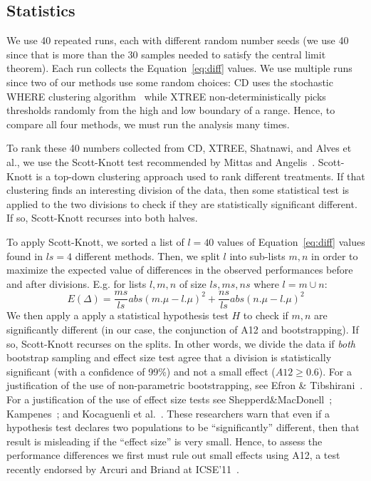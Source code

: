 \documentclass[twocolumn,5p]{elsarticle}
\newcommand{\eq}[1]{Equation~\ref{eq:#1}}
\theoremstyle{break}
\begin{document}
\begin{itemize}
		\subsection{Statistics}
		
		
		We use 40 repeated runs, each with different random number seeds (we use 40 since that is  more than the 30 samples  needed to satisfy the central limit theorem). Each run collects the \eq{diff} values.
		We use multiple runs since two of our methods use some random choices: CD uses the  stochastic WHERE clustering algorithm~\cite{localvsglobal}
		while XTREE non-deterministically picks thresholds randomly from
		the high and low boundary of a range. 
		Hence, to compare all
		four methods, we must run the analysis many times. 
		
		
		
		
		
		To rank these 40 numbers collected from CD, XTREE, Shatnawi, and Alves et al., we use the Scott-Knott test recommended by Mittas and Angelis~\cite{mittas13}. 
		Scott-Knott is a top-down clustering approach used to rank different
		treatments. If that clustering finds an interesting division of the data, then
		some statistical test is applied to the two divisions to check if they
		are statistically significant different. If so, Scott-Knott recurses
		into both halves.
		
		To  apply Scott-Knott,
		we
		sorted a list of  $l=40$ values of \eq{diff} values found in  $ls=4$ different methods. 
		Then, we split $l$ into sub-lists $m,n$ in order to maximize the expected value of differences in the observed performances before and after divisions. E.g. for lists $l,m,n$ of size $ls,ms,ns$ where $l=m\cup n$: \[E(\Delta)=\frac{ms}{ls}abs(m.\mu - l.\mu)^2 + \frac{ns}{ls}abs(n.\mu - l.\mu)^2\]
		We then apply a apply a statistical hypothesis test $H$ to check
		if $m,n$ are significantly different  (in our case, the conjunction of A12 and bootstrapping). If so, Scott-Knott recurses on the splits. In other words, we divide the data if \textit{both} bootstrap sampling and effect size test agree that a division is statistically significant (with a confidence of 99\%) and not a small effect ($A12 \ge 0.6$).
		For a justification of the use of non-parametric bootstrapping, see Efron \& Tibshirani~\cite[p220-223]{efron93}. For a justification of the use of effect size tests see Shepperd\&MacDonell~\cite{shepperd12a}; Kampenes~\cite{kampenes07}; and Kocaguenli et al.~\cite{Kocaguneli2013:ep}. These researchers warn that even if a hypothesis test declares two populations to be ``significantly'' different, then that result is misleading if the ``effect size'' is very small. Hence, to assess the performance differences we first must rule out small effects using A12, a test   recently endorsed by Arcuri and Briand at ICSE'11~\cite{arcuri11}.
		

\end{itemize}
\end{document}
